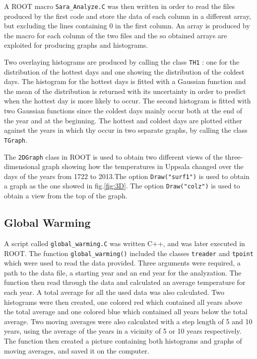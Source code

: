 \documentclass[a4paper]{article}
\begin{document}
\medskip
\medskip

A ROOT macro \texttt{Sara{\_}Analyze.C}  was then written in order to read the files produced by the first code and store the data of each column in a different array, but excluding the lines containing $0$ in the first column. An array is produced by the macro for each column of the two files and the so obtained arrays are exploited for producing graphs and histograms.

\medskip
\medskip
Two overlaying histograms are produced by calling the class \texttt{TH1} : one for the distribution of the hottest days and one showing the distribution of the coldest days. The histogram for the hottest days is fitted with a Gaussian function and the mean of the distribution is returned with its uncertainty in order to predict when the hottest day is more likely to occur. The second histogram is fitted with two Gaussian functions since the coldest days mainly occur both at the end of the year and at the beginning. The hottest and coldest days are
plotted either against the years in which thy occur in two separate graphs, by calling the class \texttt{TGraph}.

\medskip
\medskip

The \texttt{2DGraph} class in ROOT is used to obtain two different views of the three-dimensional graph showing how the temperatures in Uppsala changed over the days of the years from 1722 to 2013.The option \texttt{Draw("surf1")} is used to obtain a graph as the one showed in fig.\ref{fig:3D}. The option \texttt{Draw("colz")} is used to obtain a view from the top of the graph.

\subsection{Global Warming}

A script called \texttt{global\_warming.C} was written C++, and was later executed in ROOT. The function \texttt{global\_warming()} included the classes \texttt{treader} and \texttt{tpoint} which were used to read the data provided. Three arguments were required, a path to the data file, a starting year and an end year for the analyzation. The function then read through the data and calculated an average temperature for each year. A total average for all the used data was also calculated. Two histograms were then created, one colored red which contained all years above the total average and one colored blue which contained all years below the total average. Two moving averages were also calculated with a step length of 5 and 10 years, using the average of the years in a vicinity of 5 or 10 years respectively. The function then created a picture containing both histograms and graphs of moving averages, and saved it on the computer.
\end{document}
